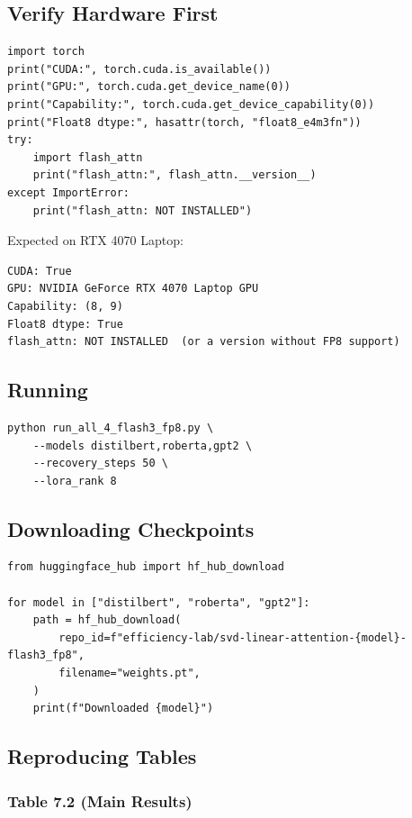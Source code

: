 \subsection{Verify Hardware First}

\begin{lstlisting}
import torch
print("CUDA:", torch.cuda.is_available())
print("GPU:", torch.cuda.get_device_name(0))
print("Capability:", torch.cuda.get_device_capability(0))
print("Float8 dtype:", hasattr(torch, "float8_e4m3fn"))
try:
    import flash_attn
    print("flash_attn:", flash_attn.__version__)
except ImportError:
    print("flash_attn: NOT INSTALLED")
\end{lstlisting}

Expected on RTX 4070 Laptop:

\begin{lstlisting}
CUDA: True
GPU: NVIDIA GeForce RTX 4070 Laptop GPU
Capability: (8, 9)
Float8 dtype: True
flash_attn: NOT INSTALLED  (or a version without FP8 support)
\end{lstlisting}

\subsection{Running}

\begin{lstlisting}
python run_all_4_flash3_fp8.py \
    --models distilbert,roberta,gpt2 \
    --recovery_steps 50 \
    --lora_rank 8
\end{lstlisting}

\subsection{Downloading Checkpoints}

\begin{lstlisting}
from huggingface_hub import hf_hub_download

for model in ["distilbert", "roberta", "gpt2"]:
    path = hf_hub_download(
        repo_id=f"efficiency-lab/svd-linear-attention-{model}-flash3_fp8",
        filename="weights.pt",
    )
    print(f"Downloaded {model}")
\end{lstlisting}

\subsection{Reproducing Tables}

\subsubsection{Table 7.2 (Main Results)}

